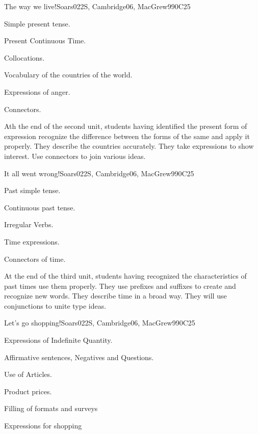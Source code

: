 \begin{syllabus}
\begin{unit}{The way we live!}{}{Soars022S, Cambridge06, MacGrew99}{0}{C25}
   \begin{topics}
      \item Simple present tense.
      \item Present Continuous Time.
      \item Collocations.
      \item Vocabulary of the countries of the world.
      \item Expressions of anger.
      \item Connectors.
   \end{topics}

   \begin{learningoutcomes}
      \item Ath the end of the second unit, students having identified the present form of expression recognize the difference between the forms of the same and apply it properly. They describe the countries accurately. They take expressions to show interest. Use connectors to join various ideas.  
   \end{learningoutcomes}
\end{unit}

\begin{unit}{It all went wrong!}{}{Soars022S, Cambridge06, MacGrew99}{0}{C25}
   \begin{topics}
      \item Past simple tense.
      \item Continuous past tense.
      \item Irregular Verbs.
      \item Time expressions.
      \item Connectors of time.
   \end{topics}

   \begin{learningoutcomes}
      \item  At the end of the third unit, students having recognized the characteristics of past times use them properly. They use prefixes and suffixes to create and recognize new words. They describe time in a broad way. They will use conjunctions to unite type ideas.
   \end{learningoutcomes}
\end{unit}

\begin{unit}{Let's go shopping!}{}{Soars022S, Cambridge06, MacGrew99}{0}{C25}
   \begin{topics}
      \item Expressions of Indefinite Quantity.
      \item Affirmative sentences, Negatives and Questions.
      \item Use of Articles.
      \item Product prices.
      \item Filling of formats and surveys
      \item Expressions for shopping
   \end{topics}


\end{unit}
\end{syllabus}
